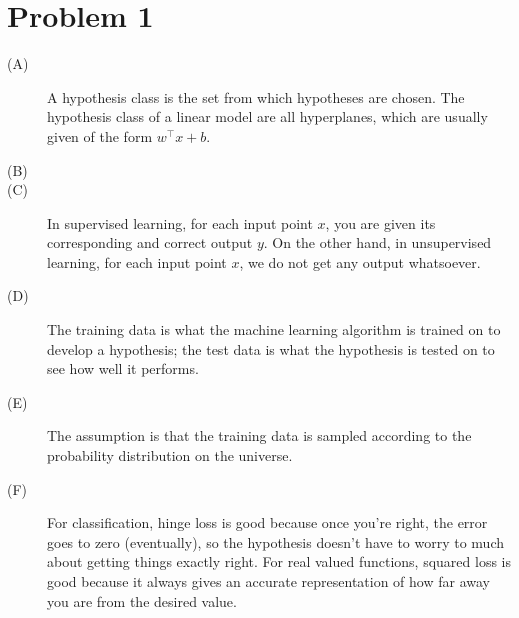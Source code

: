 \documentclass{article}
\begin{document}
\section*{Problem 1}
\begin{description}
    \item[(A)] A hypothesis class is the set from which hypotheses are chosen.
        The hypothesis class of a linear model are all hyperplanes, which
        are usually given of the form $w^{\intercal}x + b$.
    \item[(B)]
    \item[(C)] In supervised learning, for each input point $x$, you are given
        its corresponding and correct output $y$. On the other hand, in
        unsupervised learning, for each input point $x$, we do not get any
        output whatsoever.
    \item[(D)] The training data is what the machine learning algorithm is
        trained on to develop a hypothesis; the test data is what the
        hypothesis is tested on to see how well it performs.
    \item[(E)] The assumption is that the training data is sampled according
        to the probability distribution on the universe.
    \item[(F)]
        For classification, hinge loss is good because once you're right,
        the error goes to zero (eventually), so the hypothesis doesn't have
        to worry to much about getting things exactly right. For real valued
        functions, squared loss is good because it always gives an accurate
        representation of how far away you are from the desired value.
\end{description}

\end{document}
